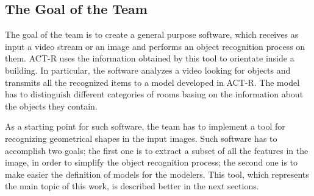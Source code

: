 		\subsection{The Goal of the Team}\label{goalTeam}
		The goal of the team is to create a general purpose software, which receives as input a video stream or an image and performs an object recognition process on them.
		\mbox{ACT-R} uses the information obtained by this tool to orientate inside a building.
		In particular, the software analyzes a video looking for objects and transmits all the recognized items to a model developed in \mbox{ACT-R}. The model has to distinguish different categories of rooms basing on the information about the objects they contain.

		As a starting point for such software, the team has to implement a tool for recognizing geometrical shapes in the input images. Such software has to accomplish two goals: the first one is to extract a subset of all the features in the image, in order to simplify the object recognition process; the second one is to make easier the definition of models for the modelers. This tool, which represents the main topic of this work, is described better in the next sections. 
		

